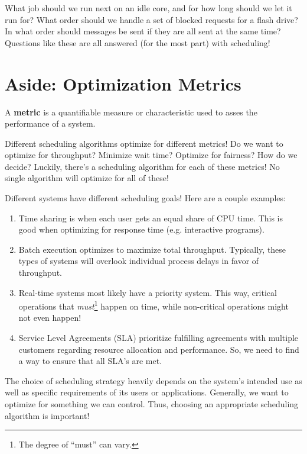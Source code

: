 \documentclass{report}
\newcommand{\definitionBegin}[1]{\begin{tcolorbox}[title={Definition: #1}]}
\newcommand{\definitionEnd}{\end{tcolorbox}}
\newcommand{\exampleBegin}[1]{\begin{tcolorbox}[colback=blue!5!white,colframe=black!75!blue,title={Example:
      #1}]}
\newcommand{\exampleEnd}{\end{tcolorbox}}
\begin{document}
\exampleBegin{Who Goes Next?}
What job should we run next on an idle core, and for how long should we let it run for? What order
should we handle a set of blocked requests for a flash drive? In what order should messages be sent
if they are all sent at the same time? Questions like these are all answered (for the most part)
with scheduling!
\exampleEnd


\section*{Aside: Optimization Metrics}
\definitionBegin{Metric}
A \textbf{metric} is a quantifiable measure or characteristic used to asses the performance of a
system.
\definitionEnd

Different scheduling algorithms optimize for different metrics! Do we want to optimize for
throughput? Minimize wait time? Optimize for fairness? How do we decide? Luckily, there's a
scheduling algorithm for each of these metrics! No single algorithm will optimize for all of these!

\exampleBegin{Metric Mania}
Different systems have different scheduling goals! Here are a couple examples:
\begin{enumerate}[label=\textit{(\roman*)}]
\item Time sharing is when each user gets an equal share of CPU time. This is good when optimizing
  for response time (e.g. interactive programs).
\item Batch execution optimizes to maximize total throughput. Typically, these types of systems will
  overlook individual process delays in favor of throughput.
\item Real-time systems most likely have a priority system. This way, critical operations that
  \textit{must}\footnote{The degree of ``must'' can vary.} happen on time, while non-critical
  operations might not even happen!
\item Service Level Agreements (SLA) prioritize fulfilling agreements with multiple customers
  regarding resource allocation and performance. So, we need to find a way to ensure that all SLA's
  are met.
\end{enumerate}
\exampleEnd

The choice of scheduling strategy heavily depends on the system's intended use as well as specific
requirements of its users or applications. Generally, we want to optimize for something we can
control. Thus, choosing an appropriate scheduling algorithm is important!
\end{document}
